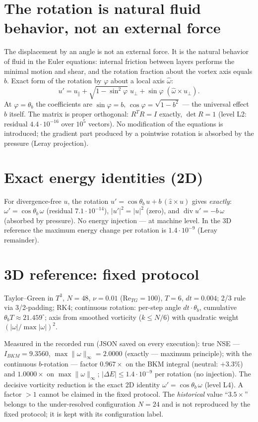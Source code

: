 \documentclass[11pt]{article}
\begin{document}
\section{The rotation is natural fluid behavior, not an external force}

The displacement by an angle is not an external force. It is the natural
behavior of fluid in the Euler equations: internal friction between layers
performs the minimal motion and shear, and the rotation fraction about the
vortex axis equals $b$. Exact form of the rotation by $\varphi$ about a local
axis $\hat\omega$:
\begin{equation}
u'=u_{\parallel}+\sqrt{1-\sin^{2}\varphi}\;u_{\perp}+\sin\varphi\;(\hat\omega\times u_{\perp}).
\label{eq:rot}
\end{equation}
At $\varphi=\theta_b$ the coefficients are $\sin\varphi=b$,
$\cos\varphi=\sqrt{1-b^{2}}$ --- the universal effect $b$ itself. The matrix is
proper orthogonal: $R^{T}R=I$ exactly, $\det R=1$ (level L2: residual
$4.4\cdot10^{-16}$ over $10^{5}$ vectors). No modification of the equations is
introduced; the gradient part produced by a pointwise rotation is absorbed by
the pressure (Leray projection).

\section{Exact energy identities (2D)}

For divergence-free $u$, the rotation $u'=\cos\theta_b\,u+b\,(\hat z\times u)$
gives \emph{exactly}: $\omega'=\cos\theta_b\,\omega$ (residual $7.1\cdot10^{-14}$),
$|u'|^{2}=|u|^{2}$ (zero), and $\operatorname{div}u'=-b\,\omega$ (absorbed by
pressure). No energy injection --- at machine level. In the 3D reference the
maximum energy change per rotation is $1.4\cdot10^{-9}$ (Leray remainder).

\section{3D reference: fixed protocol}

Taylor--Green in $T^{3}$, $N=48$, $\nu=0.01$ ($\mathrm{Re}_{TG}=100$), $T=6$,
$dt=0.004$; 2/3 rule via 3/2-padding; RK4; continuous rotation: per-step angle
$dt\cdot\theta_b$, cumulative $\theta_b T\approx21.459^\circ$; axis from
smoothed vorticity ($k\le N/6$) with quadratic weight $(|\omega|/\max|\omega|)^{2}$.

Measured in the recorded run (JSON saved on every execution): true NSE ---
$I_{BKM}=9.3560$, $\max\|\omega\|_\infty=2.0000$ (exactly --- maximum principle);
with the continuous $b$-rotation --- factor $0.967\times$ on the BKM integral
(neutral: $+3.3\%$) and $1.0000\times$ on $\max\|\omega\|_\infty$;
$|\Delta E|\le1.4\cdot10^{-9}$ per rotation (no injection). The decisive
vorticity reduction is the exact 2D identity $\omega'=\cos\theta_b\,\omega$
(level L4). A factor $>1$ cannot be claimed in the fixed protocol. The
\emph{historical} value ``$3.5\times$'' belongs to
the under-resolved configuration $N=24$ and is not reproduced by the fixed
protocol; it is kept with its configuration label.
\end{document}
